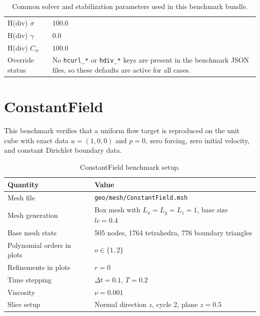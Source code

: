 \documentclass[11pt]{article}
\begin{document}
\begin{table}[H]
\begin{tabularx}{\textwidth}{@{}lX@{}}
		H(div) $\sigma$         & $100.0$                                                                                                                            \\
		H(div) $\gamma$         & $0.0$                                                                                                                              \\
		H(div) $C_w$            & $100.0$                                                                                                                            \\
		Override status         & No \texttt{hcurl\_*} or \texttt{hdiv\_*} keys are present in the benchmark JSON files, so these defaults are active for all cases. \\
		\bottomrule
	\end{tabularx}
	\caption{Common solver and stabilization parameters used in this benchmark bundle.}
\end{table}

\section{ConstantField}

This benchmark verifies that a uniform flow target is reproduced on the unit
cube with exact data $u=(1,0,0)$ and $p=0$, zero forcing, zero initial
velocity, and constant Dirichlet boundary data.

\begin{table}[H]
	\centering
	\begin{tabularx}{\textwidth}{@{}lX@{}}
		\toprule
		Quantity                   & Value                                              \\
		\midrule
		Mesh file                  & \texttt{geo/mesh/ConstantField.msh}                \\
		Mesh generation            & Box mesh with $L_x=L_y=L_z=1$, base size $lc=0.4$  \\
		Base mesh stats            & 505 nodes, 1764 tetrahedra, 776 boundary triangles \\
		Polynomial orders in plots & $o \in \{1,2\}$                                    \\
		Refinements in plots       & $r=0$                                              \\
		Time stepping              & $\Delta t=0.1$, $T=0.2$                            \\
		Viscosity                  & $\nu = 0.001$                                      \\
		Slice setup                & Normal direction $z$, cycle 2, plane $z=0.5$       \\
		\bottomrule
	\end{tabularx}
	\caption{ConstantField benchmark setup.}
\end{table}
\end{document}
